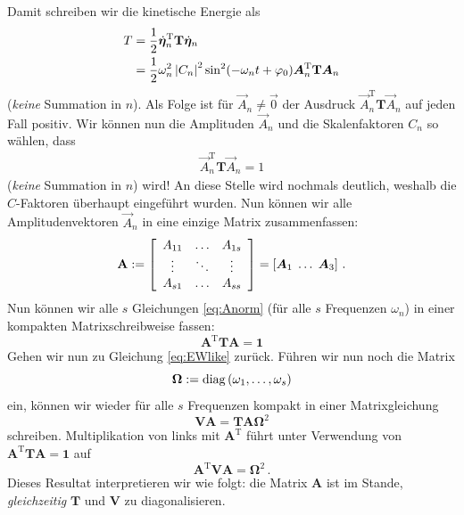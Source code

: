\documentclass[paper=a4, fontsize=11.0pt, abstractoff, DIV12]{scrartcl}
\begin{document}
Damit schreiben wir die kinetische Energie als
\begin{align}
T &= \frac{1}{2}\dot{{\boldsymbol{\eta}}}_n^\mathrm{T} \mathbf{T} \dot{{\boldsymbol{\eta}}}_n\nonumber\\
&= \frac{1}{2} \omega_n^2 \left\vert C_n \right\vert^2 \sin^2(-\omega_n t +\varphi_0) {\boldsymbol{A}}^\mathrm{T}_n\mathbf{T}{\boldsymbol{A}}_n
\end{align}
(\emph{keine} Summation in $n$).
Als Folge ist für $\vec{A}_n \ne \vec 0$ der Ausdruck $\vec
A^\mathrm{T}_n\mathbf{T}\vec{A}_n$ auf jeden Fall positiv. Wir können nun
die Amplituden $\vec{A}_n$ und die Skalenfaktoren $C_n$ so wählen, dass
\begin{align}
\vec A^\mathrm{T}_n\mathbf{T}\vec{A}_n = 1
\label{eq:Anorm}
\end{align}
(\emph{keine} Summation in $n$) wird! An diese Stelle wird nochmals deutlich, weshalb die $C$-Faktoren
überhaupt eingeführt wurden. Nun können wir alle Amplitudenvektoren $\vec
A_n$ in eine einzige Matrix zusammenfassen:
\begin{equation}
\mathbf{A} := \threeMatrix{A_{11}}{\dots}{A_{1s}}{\vdots}{\ddots}{\vdots}{A_{s1}}{\dots}{A_{ss}} = \left[\vec A_1\; \dots\;\vec A_3\right]\,.
\label{eq:AMatrix}
\end{equation}
Nun können wir alle $s$ Gleichungen \eqref{eq:Anorm} (für alle $s$ Frequenzen
$\omega_n$) in einer kompakten Matrixschreibweise fassen:
\begin{equation}
\mathbf{A}^\mathrm{T} \mathbf{T} \mathbf{A} = \mathbf{1}
\label{eq:Tdiag}
\end{equation}
Gehen wir nun zu Gleichung \eqref{eq:EWlike} zurück. Führen wir nun noch die
Matrix
\begin{equation}
\mathbf{\Omega} := \operatorname{diag}\left(\omega_1, \dots,\omega_s\right)
\end{equation}
ein, können wir wieder für alle $s$ Frequenzen kompakt in einer Matrixgleichung
\begin{equation}
\mathbf{V}\mathbf{A} = \mathbf{T}\mathbf{A}\mathbf{\Omega}^2
\end{equation}
schreiben. Multiplikation von links mit $\mathbf{A}^\mathrm{T}$ führt
unter Verwendung von $\mathbf{A}^\mathrm{T}\mathbf{T}\mathbf{A}=\mathbf{1}$ auf
\begin{equation}
\mathbf{A}^\mathrm{T}\mathbf{V}\mathbf{A} = \mathbf{\Omega}^2\,.
\label{eq:Vdiag}
\end{equation}
Dieses Resultat interpretieren wir wie folgt: die Matrix $\mathbf{A}$ ist im
Stande, \emph{gleichzeitig} $\mathbf{T}$ und $\mathbf{V}$ zu
diagonalisieren.
\end{document}
